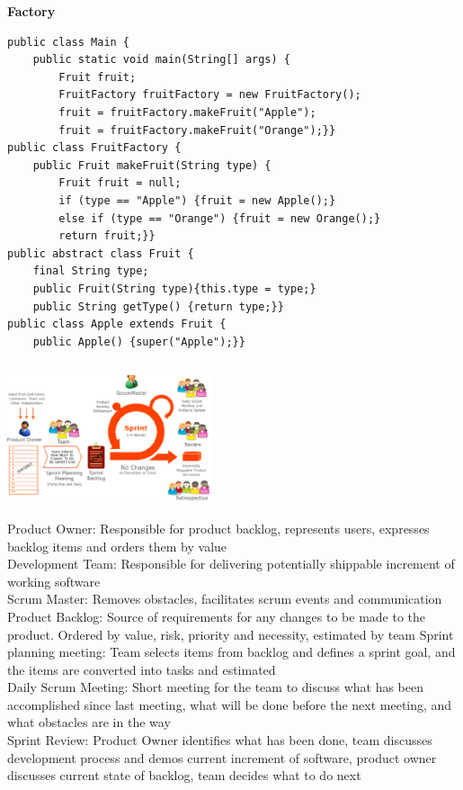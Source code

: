 \documentclass{article}
\begin{document}
\textbf{Factory}
\begin{verbatim}
public class Main {
    public static void main(String[] args) {
        Fruit fruit;
        FruitFactory fruitFactory = new FruitFactory();
        fruit = fruitFactory.makeFruit("Apple");
        fruit = fruitFactory.makeFruit("Orange");}}
public class FruitFactory {
    public Fruit makeFruit(String type) {
        Fruit fruit = null;
        if (type == "Apple") {fruit = new Apple();}
        else if (type == "Orange") {fruit = new Orange();}
        return fruit;}}
public abstract class Fruit {
    final String type;
    public Fruit(String type){this.type = type;}
    public String getType() {return type;}}
public class Apple extends Fruit {
    public Apple() {super("Apple");}}
\end{verbatim}
\includegraphics[width=6cm,height =4.5cm]{scrum.png}\\
Product Owner: Responsible for product backlog, represents users, expresses backlog items and orders them by value \\
Development Team: Responsible for delivering potentially shippable increment of working software \\
Scrum Master: Removes obstacles, facilitates scrum events and communication \\
Product Backlog: Source of requirements for any changes to be made to the product. Ordered by value, risk, priority and necessity, estimated by team
Sprint planning meeting: Team selects items from backlog and defines a sprint goal, and the items are converted into tasks and estimated \\
Daily Scrum Meeting: Short meeting for the team to discuss what has been accomplished since last meeting, what will be done before the next meeting, and what obstacles are in the way \\
Sprint Review: Product Owner identifies what has been done, team discusses development process and demos current increment of software, product owner discusses current state of backlog, team decides what to do next \\
\end{document}
